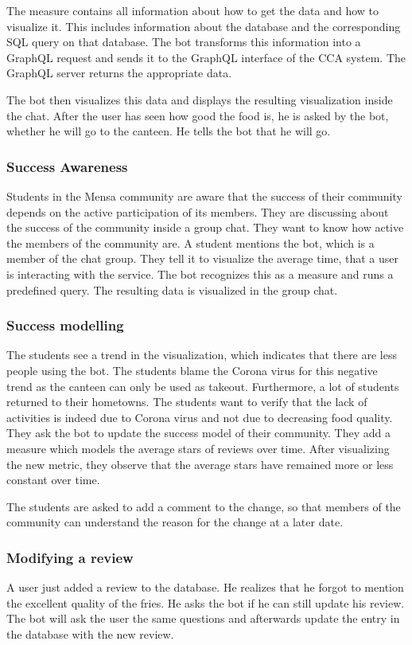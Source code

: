 The measure contains all information about how to get the data and how to visualize it. This includes information about the database and the corresponding SQL query on that database. The bot transforms this information into a GraphQL request and sends it to the GraphQL interface of the CCA system. The GraphQL server returns the appropriate data.

The bot then visualizes this data and displays the  resulting visualization inside the chat.
After the user has seen how good the food is, he is asked by the bot, whether he will go to the canteen. He tells the bot that he will go.

\subsubsection{Success Awareness} Students in the Mensa community are aware that the success of their community depends on the active participation of its members. They are discussing about the success of the community inside a group chat. They want to know how active the members of the community are. A student mentions the bot, which is a member of the chat group. They tell it to visualize the average time, that a user is interacting with the service. The bot recognizes this as a measure and runs a predefined query. The resulting data is visualized in the group chat.

\subsubsection{Success modelling} The students see a trend in the visualization, which indicates that there are less people using the bot.
The students blame the Corona virus for this negative trend as the canteen can only be used as takeout. Furthermore, a lot of students returned to their hometowns.
The students want to verify that the lack of activities is indeed due to Corona virus and not due to decreasing food quality.
They ask the bot to update the success model of their community.
They add a measure which models the average stars of reviews over time.
After visualizing the new metric, they observe that the average stars have remained more or less constant over time.

The students are asked to add a comment to the change, so that members of the community can understand the reason for the change at a later date.


\subsubsection{Modifying a review} A user just added a review to the database. He realizes that he forgot to mention the excellent quality of the fries. 
He asks the bot if he can still update his review. The bot will ask the user the same questions and afterwards update the entry in the database with the new review.

